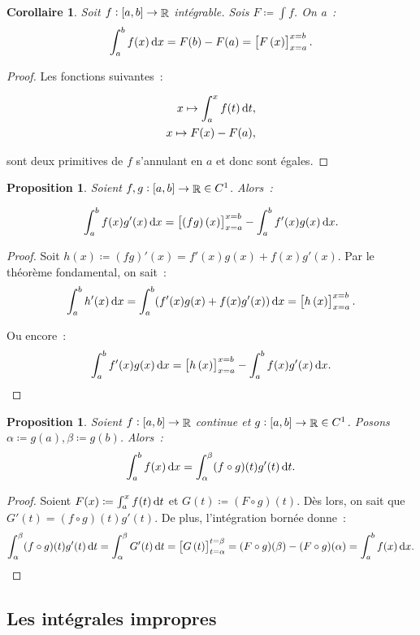 \documentclass{article}
\DeclareMathOperator{\R}{\mathbb R}
\newcommand{\ab}{\interval ab}
\newcommand{\fabr}[1]{#1 : \ab \to \R}
\newcommand{\evf}[4]{\left[#1\left(#2\right)\right]_{#2=#3}^{#2=#4}}
\newtheorem{prp}[thm]{Proposition}
\newtheorem{cor}[thm]{Corollaire}
\theoremstyle{definition}
\theoremstyle{remark}
\begin{document}
		\begin{cor} Soit $\fabr f$ intégrable. Sois $F \coloneqq \int f$. On a~:
		\[\int_a^b f(x)\dif x = F(b) - F(a) = \evf Fxab.\]
		\end{cor}

		\begin{proof} Les fonctions suivantes~:

		\begin{align*}
			x \mapsto \int_a^xf(t)\dif t, \\
			x \mapsto F(x) - F(a),
		\end{align*}

		sont deux primitives de $f$ s'annulant en $a$ et donc sont égales. \end{proof}

		\begin{prp} Soient $\fabr {f, g} \in C^1$. Alors~:

		\[\int_a^bf(x)g'(x)\dif x = \evf {(fg)}xab - \int_a^bf'(x)g(x)\dif x.\]
		\end{prp}

		\begin{proof} Soit $h(x) \coloneqq (fg)'(x) = f'(x)g(x) + f(x)g'(x)$. Par le théorème fondamental, on sait~:
		\[\int_a^bh'(x)\dif x = \int_a^b(f'(x)g(x) + f(x)g'(x))\dif x = \evf hxab.\]

		Ou encore~:
		\[\int_a^bf'(x)g(x)\dif x = \evf hxab - \int_a^bf(x)g'(x)\dif x.\]
		\end{proof}

		\begin{prp} Soient $\fabr f$ continue et $\fabr g \in C^1$. Posons $\alpha \coloneqq g(a), \beta \coloneqq g(b)$. Alors~:
		\[\int_a^bf(x)\dif x = \int_\alpha^\beta(f \circ g)(t)g'(t)\dif t.\]
		\end{prp}

		\begin{proof} Soient $F(x) \coloneqq \int_a^xf(t)\dif t$ et $G(t) \coloneqq (F \circ g)(t)$. Dès lors, on sait que $G'(t) = (f \circ g)(t)g'(t)$.
		De plus, l'intégration bornée donne~:
		\[\int_\alpha^\beta (f \circ g)(t)g'(t)\dif t = \int_\alpha^\beta G'(t)\dif t = \evf Gt\alpha\beta = (F \circ g)(\beta)-(F \circ g)(\alpha) = \int_a^b f(x)\dif x.\]
		\end{proof}

	\subsection{Les intégrales impropres}
\end{document}
